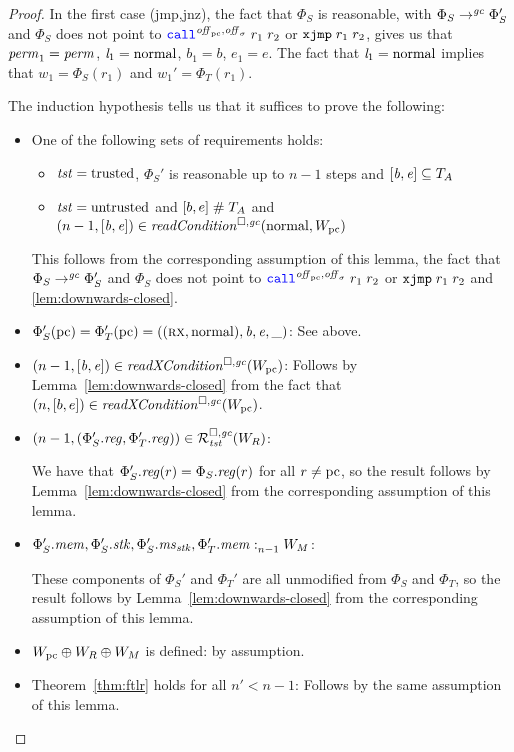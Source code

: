 \begin{proof}
  In the first case (jmp,jnz), the fact that $\Phi_S$ is reasonable, with $\Phi_S \step[\gc] \Phi_S'$ and $\Phi_S$ does not point to $\scall{\offpc,\offsigma}{r_1}{r_2}$ or $\txjmp{r_1}{r_2}$, gives us that $\perm_1 = \perm$, $\lin_1 = \normal$, $b_1 = b$, $e_1 = e$.
  The fact that $\lin_1 =\normal$ implies that $w_1 =\Phi_S(r_1)$ and $w_1' = \Phi_T(r_1)$.

  The induction hypothesis tells us that it suffices to prove the following:
  \begin{itemize}
  \item One of the following sets of requirements holds:
    \begin{itemize}
    \item $\trust = \trusted$, $\Phi_S'$ is reasonable up to $n-1$ steps and $[\baddr,\eaddr] \subseteq \ta$
    \item $\trust = \untrusted$ and $[b,e] \mathrel{\#} \ta$ and $\npair[n-1]{[\baddr,\eaddr]} \in \readCond{\normal,W_\pcreg}$
    \end{itemize}
    This follows from the corresponding assumption of this lemma, the fact that $\Phi_S \step[\gc] \Phi_S'$ and $\Phi_S$ does not point to $\scall{\offpc,\offsigma}{r_1}{r_2}$ or $\txjmp{r_1}{r_2}$ and \ref{lem:downwards-closed}.
  \item $\Phi_S'(\pcreg) = \Phi_T'(\pcreg) = ((\rx,\normal),\baddr,\eaddr,\_)$:
    See above.
  \item $\npair[n-1]{[\baddr,\eaddr]} \in \xReadCond{W_\pcreg}$:
    Follows by Lemma~\ref{lem:downwards-closed} from the fact that $\npair{[b,e]} \in \xReadCond{W_\pcreg}$.
  \item $\npair[n-1]{(\Phi_S'.\reg,\Phi_T'.\reg)} \in \lrrg{\trust}(W_R)$:

    We have that $\Phi_S'.\reg(r) = \Phi_S.\reg(r)$ for all $r \neq \pcreg$, so the result follows by Lemma~\ref{lem:downwards-closed} from the corresponding assumption of this lemma.

  \item $\memSat[n-1]{\Phi_S'.\mem,\Phi_S'.\stk,\Phi_S'.\ms_\stk,\Phi_T'.\mem}{W_M}$:

    These components of $\Phi_S'$ and $\Phi_T'$ are all unmodified from $\Phi_S$ and $\Phi_T$, so the result follows by Lemma~\ref{lem:downwards-closed} from the corresponding assumption of this lemma.

  \item $W_\pcreg \oplus W_R \oplus W_M$ is defined: by assumption.

  \item Theorem~\ref{thm:ftlr} holds for all $n' < n-1$:
    Follows by the same assumption of this lemma.
  \end{itemize}


\end{proof}
